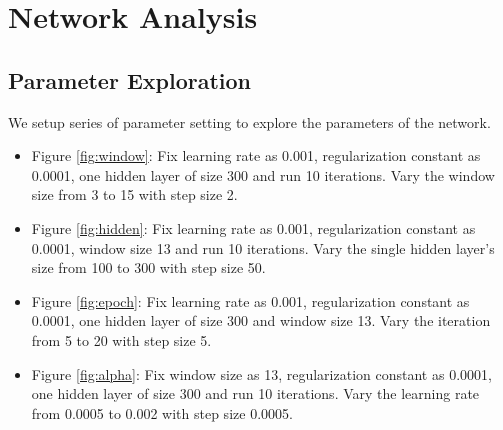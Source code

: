 \documentclass[letterpaper]{article}
\begin{document}
\section{Network Analysis}
\subsection{Parameter Exploration}
We setup series of parameter setting to explore the parameters of the network.
\begin{itemize}
\item Figure \ref{fig:window}: Fix learning rate as 0.001, regularization constant as 0.0001, one hidden layer of size 300 and run 10 iterations. Vary the window size from 3 to 15 with step size 2.
\item Figure \ref{fig:hidden}: Fix learning rate as 0.001, regularization constant as 0.0001, window size 13 and run 10 iterations. Vary the single hidden layer's size from 100 to 300 with step size 50.
\item Figure \ref{fig:epoch}: Fix learning rate as 0.001, regularization constant as 0.0001, one hidden layer of size 300 and window size 13. Vary the iteration from 5 to 20 with step size 5.
\item Figure \ref{fig:alpha}: Fix window size as 13, regularization constant as 0.0001, one hidden layer of size 300 and run 10 iterations. Vary the learning rate from 0.0005 to 0.002 with step size 0.0005.
\end{itemize}
\end{document}
